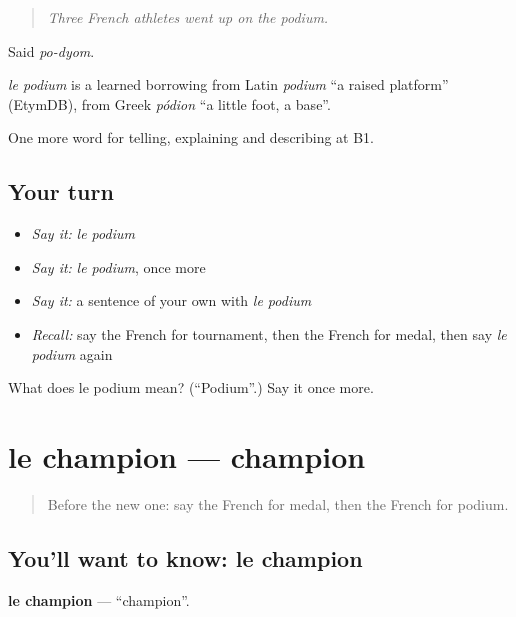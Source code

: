 \begin{quote}
\emph{Three French athletes went up on the podium.}
\end{quote}

Said \emph{po-dyom}.

\begin{cousinweb}
\emph{le podium} is a learned borrowing from Latin \emph{podium} \textquotedblleft{}a raised platform\textquotedblright{} (EtymDB), from Greek \emph{pódion} \textquotedblleft{}a little foot, a base\textquotedblright{}.
\end{cousinweb}

\begin{grammarlens}[title={What you've built}]
One more word for telling, explaining and describing at B1.
\end{grammarlens}

\subsection*{Your turn}
\begin{itemize}
\raggedright
  \item \emph{Say it:} \emph{le podium}
  \item \emph{Say it:} \emph{le podium}, once more
  \item \emph{Say it:} a sentence of your own with \emph{le podium}
  \item \emph{Recall:} say the French for tournament, then the French for medal, then say \emph{le podium} again
\end{itemize}

\begin{tcolorbox}[breakable,colback=teal!4,colframe=teal!35!black,title={Before you move on}]
What does le podium mean? (\textquotedblleft{}Podium\textquotedblright{}.) Say it once more.
\end{tcolorbox}
\section[le champion]{le champion — champion}

\label{lesson:FR-C507-champion}



\begin{quote}
Before the new one: say the French for medal, then the French for podium.
\end{quote}

\subsection*{You'll want to know: le champion}
\textbf{le champion} — \textquotedblleft{}champion\textquotedblright{}.

